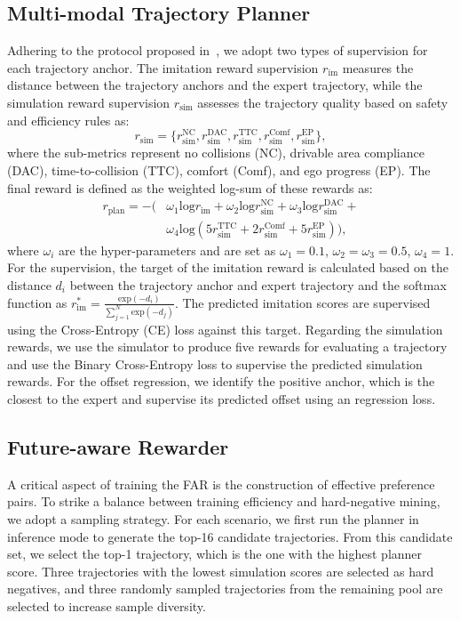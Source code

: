 \subsection{Multi-modal Trajectory Planner}
Adhering to the protocol proposed in~\cite{li2025wote}, we adopt two types of supervision for each trajectory anchor. The imitation reward supervision $r_{\text{im}}$ measures the distance between the trajectory anchors and the expert trajectory, while the simulation reward supervision $r_{\text{sim}}$ assesses the trajectory quality based on safety and efficiency rules as:
\begin{equation}
    r_{\text{sim}} = \{r_{\text{sim}}^{\text{NC}},r_{\text{sim}}^{\text{DAC}}, r_{\text{sim}}^{\text{TTC}}, r_{\text{sim}}^{\text{Comf}}, r_{\text{sim}}^{\text{EP}} \},
\end{equation}
where the sub-metrics represent no collisions (NC), drivable area compliance (DAC), time-to-collision (TTC), comfort (Comf), and ego progress (EP). The final reward is defined as the weighted log-sum of these rewards as:
\begin{equation}
\begin{split}
    r_{\text{plan}} = - \big( & \omega_1 \text{log}r_{\text{im}} + \omega_2 \text{log}r_{\text{sim}}^{\text{NC}} + \omega_3\text{log} r_{\text{sim}}^{\text{DAC}} +\\ &
    \omega_4 \text{log}(5r_{\text{sim}}^{\text{TTC}} 
     +  2r_{\text{sim}}^{\text{Comf}} +  5r_{\text{sim}}^{\text{EP}}) \big),
\end{split}
\label{eq:reward_plan}
\end{equation}
where $\omega_i$ are the hyper-parameters and are set as $\omega_1 = 0.1$, $\omega_2 = \omega_3 = 0.5$, $\omega_4 = 1$. For the supervision, the target of the imitation reward is calculated based on the  distance $d_i$ between the trajectory anchor and expert trajectory and the softmax function as $r_\text{im}^* = \frac{\text{exp}(-d_i)}{\sum_{j=1}^N\text{exp}(-d_j)}$. The predicted imitation scores are supervised using the Cross-Entropy (CE) loss against this target. Regarding the simulation rewards, we use the simulator to produce five rewards for evaluating a trajectory and use the Binary Cross-Entropy loss to supervise the predicted simulation rewards. For the offset regression, we identify the positive anchor, which is the closest to the expert and supervise its predicted offset using an  regression loss.

\subsection{Future-aware Rewarder}
\label{sup:FAR}
A critical aspect of training the FAR is the construction of effective preference pairs. To strike a balance between training efficiency and hard-negative mining, we adopt a sampling strategy. For each scenario, we first run the planner in inference mode to generate the top-16 candidate trajectories. From this candidate set, we select the top-1 trajectory, which is the one with the highest planner score. Three trajectories with the lowest simulation scores are selected as hard negatives, and three randomly sampled trajectories from the remaining pool are selected to increase sample diversity.

